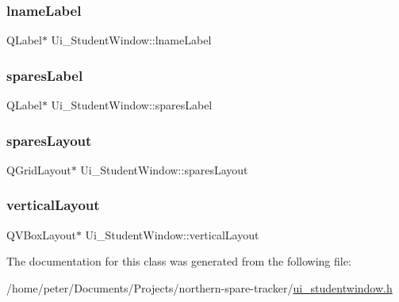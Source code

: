 \subsubsection{\texorpdfstring{lname\+Label}{lnameLabel}}
{\footnotesize\ttfamily Q\+Label$\ast$ Ui\+\_\+\+Student\+Window\+::lname\+Label}

\mbox{\label{class_ui___student_window_af8d90aee0ee822ed32f2c33ed572c9b3}} 
\subsubsection{\texorpdfstring{spares\+Label}{sparesLabel}}
{\footnotesize\ttfamily Q\+Label$\ast$ Ui\+\_\+\+Student\+Window\+::spares\+Label}

\mbox{\label{class_ui___student_window_a1dcada1d3e4c870348c466990f468b45}} 
\subsubsection{\texorpdfstring{spares\+Layout}{sparesLayout}}
{\footnotesize\ttfamily Q\+Grid\+Layout$\ast$ Ui\+\_\+\+Student\+Window\+::spares\+Layout}

\mbox{\label{class_ui___student_window_a5e13b0cf94d07e28771f59bdfe9e46e2}} 
\subsubsection{\texorpdfstring{vertical\+Layout}{verticalLayout}}
{\footnotesize\ttfamily Q\+V\+Box\+Layout$\ast$ Ui\+\_\+\+Student\+Window\+::vertical\+Layout}



The documentation for this class was generated from the following file\+:\begin{DoxyCompactItemize}
\item 
/home/peter/\+Documents/\+Projects/northern-\/spare-\/tracker/\hyperlink{ui__studentwindow_8h}{ui\+\_\+studentwindow.\+h}\end{DoxyCompactItemize}
